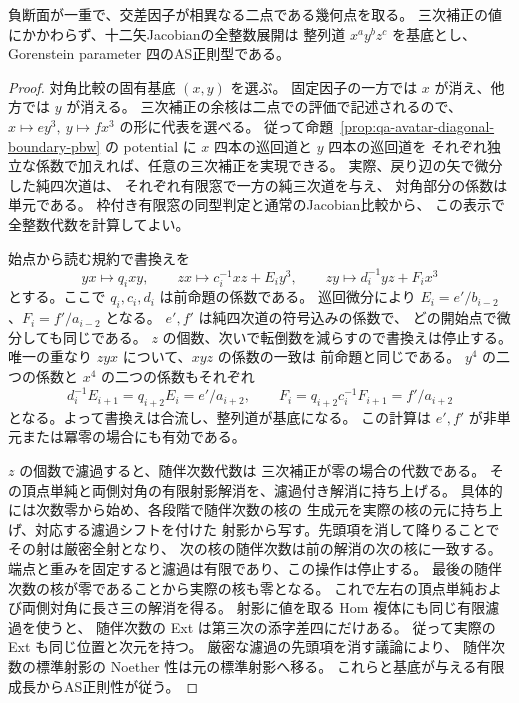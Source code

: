 \begin{theorem}[二交点境界全体のPBW基底とAS正則性]
\label{thm:qa-avatar-semisimple-boundary-regular}
負断面が一重で、交差因子が相異なる二点である幾何点を取る。
三次補正の値にかかわらず、十二矢Jacobianの全整数展開は
整列道 $x^a y^b z^c$ を基底とし、
Gorenstein parameter 四のAS正則型である。
\end{theorem}
\begin{proof}
対角比較の固有基底 $(x,y)$ を選ぶ。
固定因子の一方では $x$ が消え、他方では $y$ が消える。
三次補正の余核は二点での評価で記述されるので、
$x\mapsto e y^3,\ y\mapsto f x^3$ の形に代表を選べる。
従って命題~\ref{prop:qa-avatar-diagonal-boundary-pbw}
の potential に $x$ 四本の巡回道と $y$ 四本の巡回道を
それぞれ独立な係数で加えれば、任意の三次補正を実現できる。
実際、戻り辺の矢で微分した純四次道は、
それぞれ有限窓で一方の純三次道を与え、
対角部分の係数は単元である。
枠付き有限窓の同型判定と通常のJacobian比較から、
この表示で全整数代数を計算してよい。

始点から読む規約で書換えを
\[
 yx\mapsto q_i xy,\qquad
 zx\mapsto c_i^{-1}xz+E_i y^3,\qquad
 zy\mapsto d_i^{-1}yz+F_i x^3
\]
とする。ここで $q_i,c_i,d_i$ は前命題の係数である。
巡回微分により $E_i=e'/b_{i-2}$、$F_i=f'/a_{i-2}$ となる。
$e',f'$ は純四次道の符号込みの係数で、
どの開始点で微分しても同じである。
$z$ の個数、次いで転倒数を減らすので書換えは停止する。
唯一の重なり $zyx$ について、$xyz$ の係数の一致は
前命題と同じである。
$y^4$ の二つの係数と $x^4$ の二つの係数もそれぞれ
\[
 d_i^{-1}E_{i+1}=q_{i+2}E_i=e'/a_{i+2},
 \qquad
 F_i=q_{i+2}c_i^{-1}F_{i+1}=f'/a_{i+2}
\]
となる。よって書換えは合流し、整列道が基底になる。
この計算は $e',f'$ が非単元または冪零の場合にも有効である。

$z$ の個数で濾過すると、随伴次数代数は
三次補正が零の場合の代数である。
その頂点単純と両側対角の有限射影解消を、濾過付き解消に持ち上げる。
具体的には次数零から始め、各段階で随伴次数の核の
生成元を実際の核の元に持ち上げ、対応する濾過シフトを付けた
射影から写す。先頭項を消して降りることでその射は厳密全射となり、
次の核の随伴次数は前の解消の次の核に一致する。
端点と重みを固定すると濾過は有限であり、この操作は停止する。
最後の随伴次数の核が零であることから実際の核も零となる。
これで左右の頂点単純および両側対角に長さ三の解消を得る。
射影に値を取る Hom 複体にも同じ有限濾過を使うと、
随伴次数の Ext は第三次の添字差四にだけある。
従って実際の Ext も同じ位置と次元を持つ。
厳密な濾過の先頭項を消す議論により、
随伴次数の標準射影の Noether 性は元の標準射影へ移る。
これらと基底が与える有限成長からAS正則性が従う。
\end{proof}

